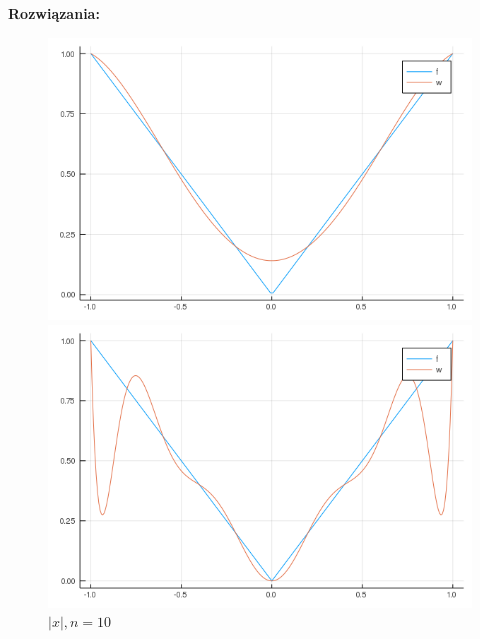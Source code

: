 \documentclass[12pt]{article}
\begin{document}
\noindent \textbf{Rozwiązania:}
\begin{figure}[!htb]
  \includegraphics[width=\linewidth]{myplot_3_5.png}
  \caption{$|x|, n=5$}
\endminipage\hfill
{}
  \includegraphics[width=\linewidth]{myplot_3_10.png}
  \caption{$|x|, n=10$}
\endminipage
\end{figure}
\end{document}

